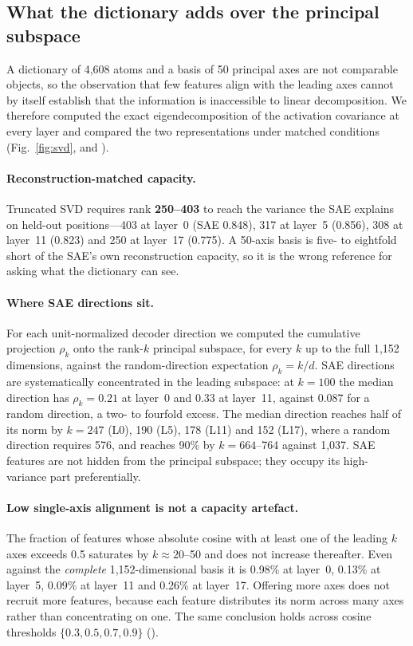 \documentclass[onecolumn,11pt]{article}
\begin{document}
\subsection*{What the dictionary adds over the principal subspace}
\label{sec:svd}

A dictionary of 4,608 atoms and a basis of 50 principal axes are not comparable objects, so the
observation that few features align with the leading axes cannot by itself establish that the
information is inaccessible to linear decomposition. We therefore computed the exact
eigendecomposition of the activation covariance at every layer and compared the two representations
under matched conditions (Fig.~\ref{fig:svd},  and ).

\paragraph{Reconstruction-matched capacity.} Truncated SVD requires rank \textbf{250--403} to reach
the variance the SAE explains on held-out positions---403 at layer~0 (SAE 0.848), 317 at layer~5
(0.856), 308 at layer~11 (0.823) and 250 at layer~17 (0.775). A 50-axis basis is five- to eightfold
short of the SAE's own reconstruction capacity, so it is the wrong reference for asking what the
dictionary can see.

\paragraph{Where SAE directions sit.} For each unit-normalized decoder direction we computed the
cumulative projection $\rho_k$ onto the rank-$k$ principal subspace, for every $k$ up to the full
1,152 dimensions, against the random-direction expectation $\rho_k = k/d$. SAE directions are
systematically concentrated in the leading subspace: at $k{=}100$ the median direction has
$\rho_k = 0.21$ at layer~0 and 0.33 at layer~11, against 0.087 for a random direction, a two- to
fourfold excess. The median direction reaches half of its norm by $k = 247$ (L0), 190 (L5), 178
(L11) and 152 (L17), where a random direction requires 576, and reaches 90\% by $k = 664$--764
against 1,037. SAE features are not hidden from the principal subspace; they occupy its
high-variance part preferentially.

\paragraph{Low single-axis alignment is not a capacity artefact.} The fraction of features whose
absolute cosine with at least one of the leading $k$ axes exceeds 0.5 saturates by $k \approx
20$--50 and does not increase thereafter. Even against the \emph{complete} 1,152-dimensional basis
it is 0.98\% at layer~0, 0.13\% at layer~5, 0.09\% at layer~11 and 0.26\% at layer~17. Offering more
axes does not recruit more features, because each feature distributes its norm across many axes
rather than concentrating on one. The same conclusion holds across cosine thresholds
$\{0.3, 0.5, 0.7, 0.9\}$ ().
\end{document}
